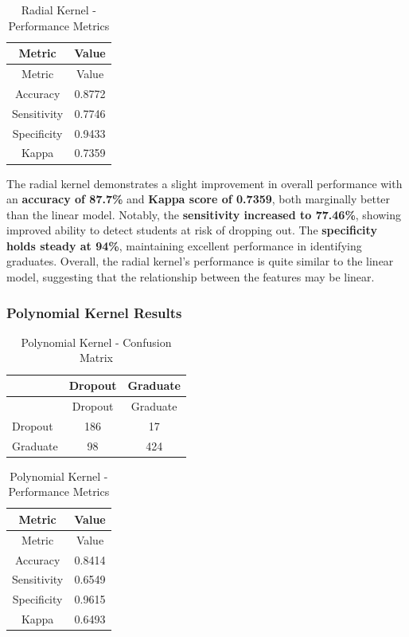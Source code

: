 \documentclass[
]{article}
\begin{document}
\begin{longtable}[]{@{}cc@{}}
\caption{Radial Kernel - Performance Metrics}\tabularnewline
\toprule\noalign{}
Metric & Value \\
\midrule\noalign{}
\endfirsthead
\toprule\noalign{}
Metric & Value \\
\midrule\noalign{}
\endhead
\bottomrule\noalign{}
\endlastfoot
Accuracy & 0.8772 \\
Sensitivity & 0.7746 \\
Specificity & 0.9433 \\
Kappa & 0.7359 \\
\end{longtable}

The radial kernel demonstrates a slight improvement in overall
performance with an \textbf{accuracy of 87.7\%} and \textbf{Kappa score
of 0.7359}, both marginally better than the linear model. Notably, the
\textbf{sensitivity increased to 77.46\%}, showing improved ability to
detect students at risk of dropping out. The \textbf{specificity holds
steady at 94\%}, maintaining excellent performance in identifying
graduates. Overall, the radial kernel's performance is quite similar to
the linear model, suggesting that the relationship between the features
may be linear.

\subsubsection{Polynomial Kernel
Results}\label{polynomial-kernel-results}

\begin{longtable}[]{@{}lcc@{}}
\caption{Polynomial Kernel - Confusion Matrix}\tabularnewline
\toprule\noalign{}
& Dropout & Graduate \\
\midrule\noalign{}
\endfirsthead
\toprule\noalign{}
& Dropout & Graduate \\
\midrule\noalign{}
\endhead
\bottomrule\noalign{}
\endlastfoot
Dropout & 186 & 17 \\
Graduate & 98 & 424 \\
\end{longtable}

\begin{longtable}[]{@{}cc@{}}
\caption{Polynomial Kernel - Performance Metrics}\tabularnewline
\toprule\noalign{}
Metric & Value \\
\midrule\noalign{}
\endfirsthead
\toprule\noalign{}
Metric & Value \\
\midrule\noalign{}
\endhead
\bottomrule\noalign{}
\endlastfoot
Accuracy & 0.8414 \\
Sensitivity & 0.6549 \\
Specificity & 0.9615 \\
Kappa & 0.6493 \\
\end{longtable}
\end{document}
